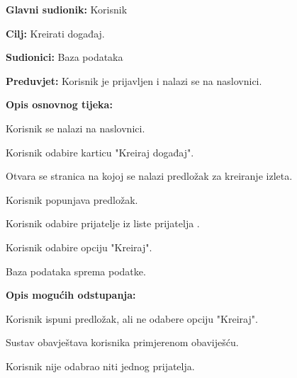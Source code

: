 		
		\noindent {}
		\begin{packed_item}
			
			\item \textbf{Glavni sudionik: } Korisnik
			\item  \textbf{Cilj:} Kreirati događaj.
			\item  \textbf{Sudionici:} Baza podataka
			\item  \textbf{Preduvjet:} Korisnik je prijavljen i nalazi se na naslovnici.
			\item  \textbf{Opis osnovnog tijeka:}
			
			\item[] \begin{packed_enum}
				
				\item Korisnik se nalazi na naslovnici.
				\item Korisnik odabire karticu "Kreiraj događaj".
				\item Otvara se stranica na kojoj se nalazi predložak za kreiranje izleta.
				\item Korisnik popunjava predložak.
				\item Korisnik odabire prijatelje iz liste prijatelja .
				\item Korisnik odabire opciju "Kreiraj".
				\item Baza podataka sprema podatke.
				
			\end{packed_enum}
			
			\item  \textbf{Opis mogućih odstupanja:}
			
			\item[] \begin{packed_item}
				
				\item[4.a] Korisnik ispuni predložak, ali ne odabere opciju "Kreiraj". 
				\item[] \begin{packed_enum}
					
					\item Sustav obavještava korisnika primjerenom obaviješću.
				\end{packed_enum}
			
				\item[5.a] Korisnik nije odabrao niti jednog prijatelja. 
				\item[] \begin{packed_enum}
				

\end{packed_enum}
\end{packed_item}
\end{packed_item}
